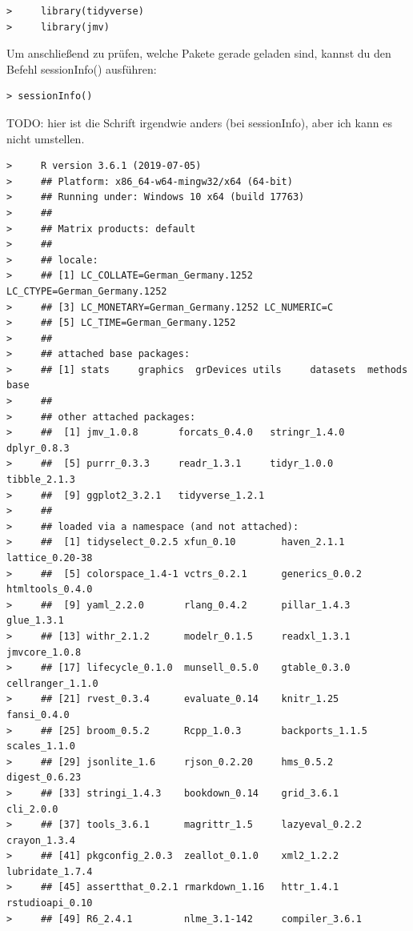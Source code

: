 \documentclass[
]{book}
\begin{document}
\begin{verbatim}
>     library(tidyverse)
>     library(jmv)
\end{verbatim}

Um anschließend zu prüfen, welche Pakete gerade geladen sind, kannst du den Befehl sessionInfo() ausführen:~

\begin{verbatim}
> sessionInfo()
\end{verbatim}

TODO: hier ist die Schrift irgendwie anders (bei sessionInfo), aber ich kann es nicht umstellen.

\begin{verbatim}
>     R version 3.6.1 (2019-07-05)
>     ## Platform: x86_64-w64-mingw32/x64 (64-bit)
>     ## Running under: Windows 10 x64 (build 17763)
>     ## 
>     ## Matrix products: default
>     ## 
>     ## locale:
>     ## [1] LC_COLLATE=German_Germany.1252  LC_CTYPE=German_Germany.1252   
>     ## [3] LC_MONETARY=German_Germany.1252 LC_NUMERIC=C                   
>     ## [5] LC_TIME=German_Germany.1252    
>     ## 
>     ## attached base packages:
>     ## [1] stats     graphics  grDevices utils     datasets  methods   base     
>     ## 
>     ## other attached packages:
>     ##  [1] jmv_1.0.8       forcats_0.4.0   stringr_1.4.0   dplyr_0.8.3    
>     ##  [5] purrr_0.3.3     readr_1.3.1     tidyr_1.0.0     tibble_2.1.3   
>     ##  [9] ggplot2_3.2.1   tidyverse_1.2.1
>     ## 
>     ## loaded via a namespace (and not attached):
>     ##  [1] tidyselect_0.2.5 xfun_0.10        haven_2.1.1      lattice_0.20-38 
>     ##  [5] colorspace_1.4-1 vctrs_0.2.1      generics_0.0.2   htmltools_0.4.0 
>     ##  [9] yaml_2.2.0       rlang_0.4.2      pillar_1.4.3     glue_1.3.1      
>     ## [13] withr_2.1.2      modelr_0.1.5     readxl_1.3.1     jmvcore_1.0.8   
>     ## [17] lifecycle_0.1.0  munsell_0.5.0    gtable_0.3.0     cellranger_1.1.0
>     ## [21] rvest_0.3.4      evaluate_0.14    knitr_1.25       fansi_0.4.0     
>     ## [25] broom_0.5.2      Rcpp_1.0.3       backports_1.1.5  scales_1.1.0    
>     ## [29] jsonlite_1.6     rjson_0.2.20     hms_0.5.2        digest_0.6.23   
>     ## [33] stringi_1.4.3    bookdown_0.14    grid_3.6.1       cli_2.0.0       
>     ## [37] tools_3.6.1      magrittr_1.5     lazyeval_0.2.2   crayon_1.3.4    
>     ## [41] pkgconfig_2.0.3  zeallot_0.1.0    xml2_1.2.2       lubridate_1.7.4 
>     ## [45] assertthat_0.2.1 rmarkdown_1.16   httr_1.4.1       rstudioapi_0.10 
>     ## [49] R6_2.4.1         nlme_3.1-142     compiler_3.6.1
\end{verbatim}
\end{document}

